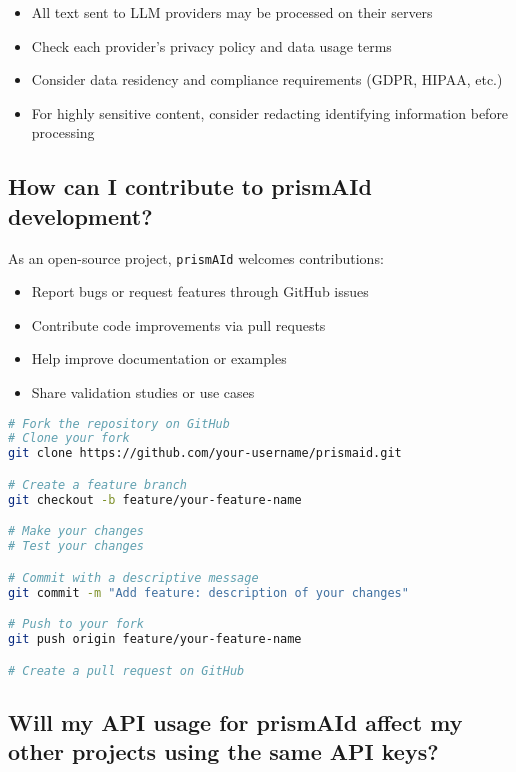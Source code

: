 \begin{itemize}
    \item All text sent to LLM providers may be processed on their servers
    \item Check each provider's privacy policy and data usage terms
    \item Consider data residency and compliance requirements (GDPR, HIPAA, etc.)
    \item For highly sensitive content, consider redacting identifying information before processing
\end{itemize}

\subsection{How can I contribute to prismAId development?}

As an open-source project, \texttt{prismAId} welcomes contributions:

\begin{itemize}
    \item Report bugs or request features through GitHub issues
    \item Contribute code improvements via pull requests
    \item Help improve documentation or examples
    \item Share validation studies or use cases
\end{itemize}

\begin{commandbox}
\begin{lstlisting}[language=Bash]
# Fork the repository on GitHub
# Clone your fork
git clone https://github.com/your-username/prismaid.git

# Create a feature branch
git checkout -b feature/your-feature-name

# Make your changes
# Test your changes

# Commit with a descriptive message
git commit -m "Add feature: description of your changes"

# Push to your fork
git push origin feature/your-feature-name

# Create a pull request on GitHub
\end{lstlisting}
\end{commandbox}

\subsection{Will my API usage for prismAId affect my other projects using the same API keys?}

